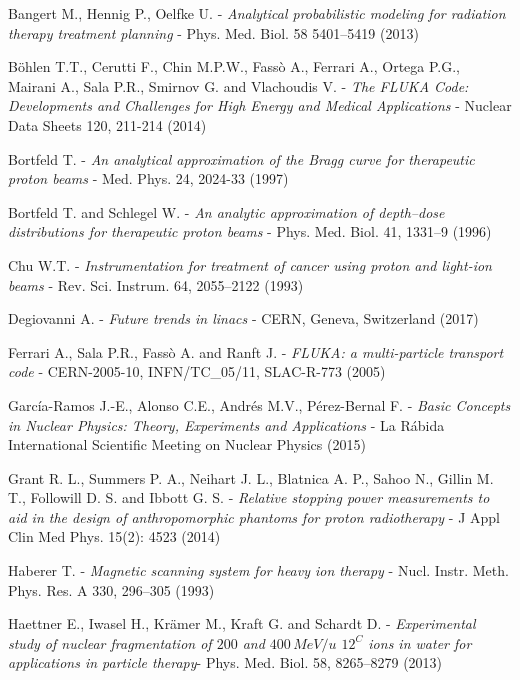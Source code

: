 \documentclass[12pt, a4paper, twoside]{book}
\begin{document}
\begin{thebibliography}{99}

Bangert M., Hennig P., Oelfke U. -
\emph{Analytical probabilistic modeling for radiation therapy treatment planning} - 
Phys. Med. Biol. 58 5401–5419 (2013)

Böhlen T.T., Cerutti F., Chin M.P.W., Fassò A., Ferrari  A., Ortega P.G., Mairani A., Sala P.R., Smirnov G. and Vlachoudis V. -
\emph{The FLUKA Code: Developments and Challenges for High Energy and Medical Applications} -
Nuclear Data Sheets 120, 211-214 (2014) 

Bortfeld T. -
\emph{An analytical approximation of the Bragg curve for therapeutic proton beams} -
Med. Phys. 24, 2024-33 (1997)

Bortfeld T. and Schlegel W. -
\emph{An analytic approximation of depth–dose distributions for therapeutic proton beams} -
Phys. Med. Biol. 41, 1331–9 (1996)

Chu W.T. - 
\emph{Instrumentation for treatment of cancer using proton and light-ion beams} -
Rev. Sci. Instrum. 64, 2055–2122 (1993)

Degiovanni A. -
\emph{Future trends in linacs} - 
CERN, Geneva, Switzerland (2017)

Ferrari A., Sala P.R., Fassò A. and Ranft J. -
\emph{FLUKA: a multi-particle transport code} -
CERN-2005-10, INFN/TC\_05/11, SLAC-R-773 (2005)

García-Ramos J.-E., Alonso C.E., Andrés M.V., Pérez-Bernal F. -
\emph{Basic Concepts in Nuclear Physics: Theory, Experiments and Applications} -
La Rábida International Scientific Meeting on Nuclear Physics (2015)

Grant R. L., Summers P. A., Neihart J. L., Blatnica A. P., Sahoo N., Gillin M. T., Followill D. S. and Ibbott G. S. -
\emph{Relative stopping power measurements to aid in the design of anthropomorphic phantoms for proton radiotherapy} -
J Appl Clin Med Phys. 15(2): 4523 (2014)

Haberer T. - 
\emph{Magnetic scanning system for heavy ion therapy} -
Nucl. Instr. Meth. Phys. Res. A 330, 296–305 (1993)

Haettner E., Iwasel H., Krämer M., Kraft G. and Schardt D. -
\emph{Experimental study of nuclear fragmentation of $200$ and $400\,MeV/u$ ${12}^C$ ions in water for applications in particle therapy}-
Phys. Med. Biol. 58, 8265–8279 (2013)


\end{thebibliography}
\end{document}
